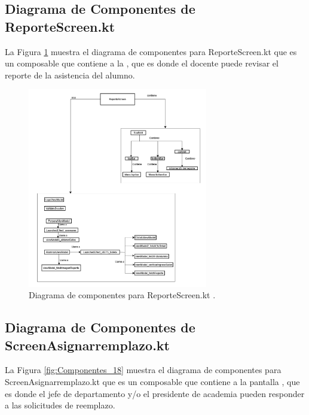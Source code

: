 \newpage

\subsection{Diagrama de Componentes de ReporteScreen.kt}

La Figura \ref{fig:Componentes_17} muestra el diagrama de componentes para ReporteScreen.kt que es un composable que contiene a la , que es donde el docente puede revisar el reporte de la asistencia del alumno.

\begin{figure}[htbp!]
	\begin{center}
		\includegraphics[width=0.7\textwidth]{DiagramasMoviles/DCM (30)}
		\caption{Diagrama de componentes para ReporteScreen.kt .}
		\label{fig:Componentes_17}
	\end{center}
\end{figure}

\newpage

\subsection{Diagrama de Componentes de ScreenAsignarremplazo.kt}

La Figura \ref{fig:Componentes_18} muestra el diagrama de componentes para ScreenAsignarremplazo.kt que es un composable que contiene a la pantalla , que es donde el jefe de departamento y/o el presidente de academia pueden responder a las solicitudes de reemplazo.

